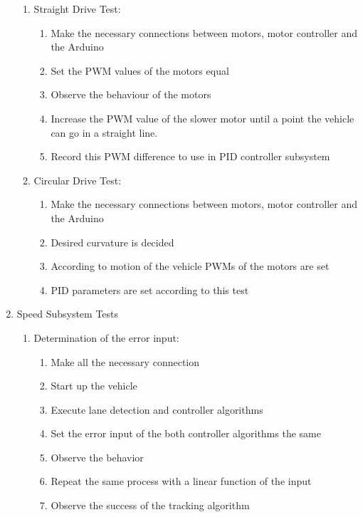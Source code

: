 \documentclass[a4paper,12pt]{article}
\begin{document}
\begin{enumerate}
\begin{enumerate}
		\item Straight Drive Test:
			
			\begin{enumerate}
				\item Make the necessary connections between motors, motor controller and the Arduino  
				\item Set the PWM values of the motors equal  
				\item Observe the behaviour of the motors  
				\item Increase the PWM value of the slower motor until a point the vehicle can go in a straight line.
				\item Record this PWM difference to use in PID controller subsystem
			\end{enumerate}
				
			
		
		\item Circular Drive Test:
			\begin{enumerate}
				\item Make the necessary connections between motors, motor controller and the Arduino  
				\item Desired curvature is decided  
				\item  According to motion of the vehicle PWMs of the motors are set  
				\item  PID parameters are set according to this test
			\end{enumerate}
		
		
	\end{enumerate}
	
	
	
	\item {Speed Subsystem Tests}
	\begin{enumerate}
		\item Determination of the error input:
		\begin{enumerate}
			\item Make all the necessary connection
			\item Start up the vehicle
			\item Execute lane detection and controller algorithms
			\item Set the error input of the both controller algorithms the same
			\item Observe the behavior
			\item Repeat the same process with a linear function of the input
			\item Observe the success of the tracking algorithm
		\end{enumerate}
		


\end{enumerate}
\end{enumerate}
\end{document}
